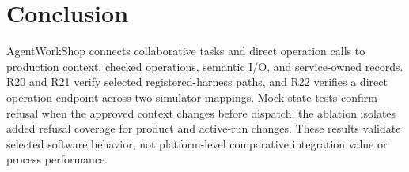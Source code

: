 \section{Conclusion}
\label{sec:conclusion}
AgentWorkShop connects collaborative tasks and direct operation calls to
production context, checked operations, semantic I/O, and service-owned
records. R20 and R21 verify selected registered-harness paths, and R22
verifies a direct operation endpoint across two simulator mappings. Mock-state
tests confirm refusal when the approved context changes before dispatch; the
ablation isolates added refusal coverage for product and active-run changes.
These results validate selected software behavior, not platform-level
comparative integration value or process performance.
